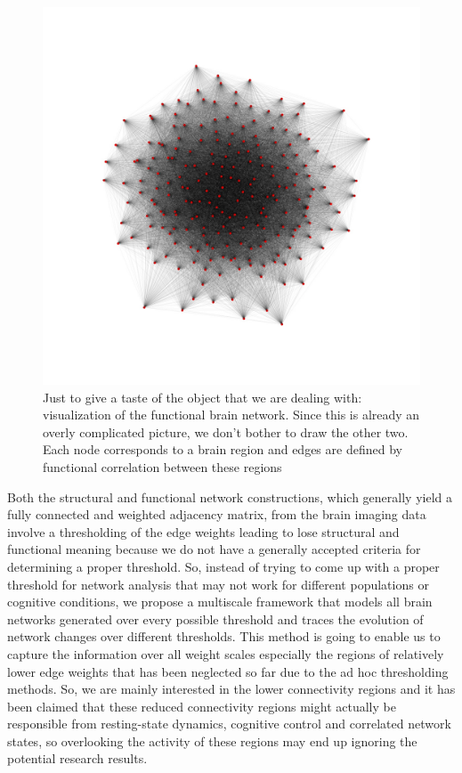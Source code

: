 \documentclass[9pt,twocolumn,twoside,lineno]{pnas-new}
\begin{document}
\begin{figure}%
\centering
\includegraphics[width=.8\linewidth]{spring.jpg}
\caption{Just to give a taste of the object that we are dealing with: visualization of the functional brain network. Since this is already an overly complicated picture, we don't bother to draw the other two. Each node corresponds to a brain region and edges are defined by functional correlation between  these regions}
\label{fig:network}
\end{figure}

Both the structural and functional network constructions, which generally yield a fully connected and weighted adjacency matrix, from the brain imaging data involve a thresholding of the edge weights leading to lose structural and functional meaning because we do not have a generally accepted criteria for determining a proper threshold. So, instead of trying to come up with a proper threshold for network analysis that may not work for different populations or cognitive conditions, we propose a multiscale framework that models all brain networks generated over every possible threshold and traces the evolution of network changes over different thresholds. This method is going to enable us to capture the information over all weight scales especially the regions of relatively lower edge weights that has been neglected so far due to the ad hoc thresholding methods. So, we are mainly interested in the lower connectivity regions and it has been claimed that these reduced connectivity regions might actually be responsible from resting-state dynamics\cite{weakedges,weakedges1}, cognitive control\cite{weakedges2} and correlated network states\cite{weakedges3}, so overlooking the activity of these regions may end up ignoring the potential research results.
\end{document}
